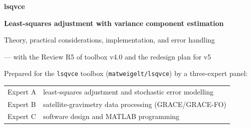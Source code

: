 \documentclass[11pt,a4paper,twoside,openany]{report}
\newcommand{\code}[1]{\texttt{#1}}
\newcommand{\lsq}{\code{lsqvce}}
\begin{document}
\begin{titlepage}
\vspace*{30mm}
{\bfseries\Huge lsqvce\par}
\vspace{6mm}
{\bfseries\LARGE Least-squares adjustment with variance component estimation\par}
\vspace{4mm}
{\Large Theory, practical considerations, implementation, and error handling\par}
\vspace{2mm}
{\Large --- with the Review R5 of toolbox v4.0 and the redesign plan for v5\par}
\vspace{14mm}
{\large Prepared for the \lsq{} toolbox (\code{matweigelt/lsqvce}) by a three-expert panel:\par}
\vspace{3mm}
\begin{tabular}{@{}ll@{}}
Expert A & least-squares adjustment and stochastic error modelling\\
Expert B & satellite-gravimetry data processing (GRACE/GRACE-FO)\\
Expert C & software design and MATLAB programming\\
\end{tabular}
\vspace{14mm}


\end{titlepage}
\end{document}

